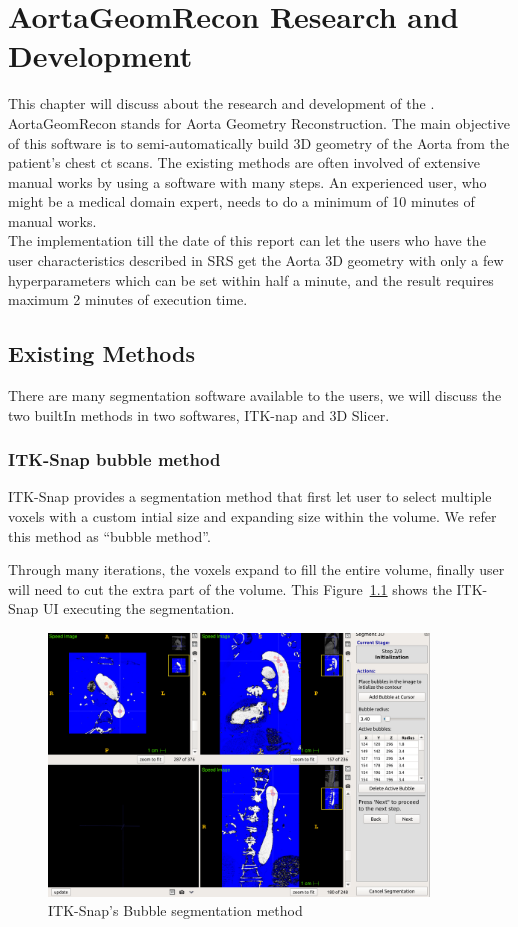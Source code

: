 \chapter{AortaGeomRecon Research and Development}
This chapter will discuss about the research and development of the \progname{}. \\
AortaGeomRecon stands for Aorta Geometry Reconstruction. The main objective of this software is to semi-automatically build 3D geometry of the Aorta from the patient's chest ct scans.  The existing methods are often involved of extensive manual works by using a software with many steps. An experienced user, who might be a medical domain expert, needs to do a minimum of 10 minutes of manual works. \\
The implementation till the date of this report can let the users who have the user characteristics described in SRS \citep{SRS} get the Aorta 3D geometry with only a few hyperparameters which can be set within half a minute, and the result requires maximum 2 minutes of execution time. \\


\section{Existing Methods}
There are many segmentation software available to the users, we will discuss the two builtIn methods in two softwares, ITK-nap and 3D Slicer.

\subsection{ITK-Snap bubble method} 
\indent
ITK-Snap provides a segmentation method that first let user to select multiple voxels with a custom intial size and expanding size within the volume. We refer this method as ``bubble method''.

Through many iterations, the voxels expand to fill the entire volume, finally user will need to cut the extra part of the volume. This Figure~\ref{fig_ITK} shows the ITK-Snap UI executing the segmentation.

\begin{figure}[ht]
    \centering
    \includegraphics[width=0.9\textwidth]{figures/AGR/bubbles.png}
    \caption[ITK-Snap's Bubble segmentation UI]{ITK-Snap's Bubble segmentation method}
    \label{fig_ITK}
\end{figure}

